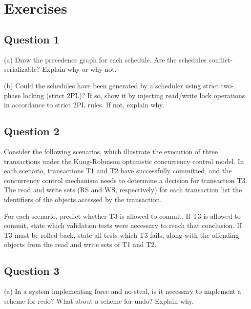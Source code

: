 \documentclass[12pt,a4paper]{article}
\begin{document}
\title{\Module\\\Uebung}
\author{\Studentenname}
\maketitle

\section*{Exercises} 
\label{sec:exercises}

\subsection*{Question 1}
\label{sec:eq1}

(a) Draw the precedence graph for each schedule. Are the schedules conflict-serializable? Explain
why or why not.

(b) Could the schedules have been generated by a scheduler using strict two-phase locking (strict
2PL)? If so, show it by injecting read/write lock operations in accordance to strict 2PL rules. If
not, explain why.


\subsection*{Question 2}
\label{sec:eq2}

Consider the following scenarios, which illustrate the
execution of three transactions under the Kung-Robinson optimistic concurrency control model. In each
scenario, transactions T1 and T2 have successfully committed, and the concurrency control mechanism
needs to determine a decision for transaction T3. The read and write sets (RS and WS, respectively) for
each transaction list the identifiers of the objects accessed by the transaction.

For each scenario, predict whether T3 is allowed to commit. If T3 is allowed to commit, state which
validation tests were necessary to reach that conclusion. If T3 must be rolled back, state all tests which T3
fails, along with the offending objects from the read and write sets of T1 and T2.


\subsection*{Question 3}
\label{sec:eq3}

(a) In a system implementing force and no-steal, is it necessary to implement a scheme for redo?
What about a scheme for undo? Explain why.
\end{document}
